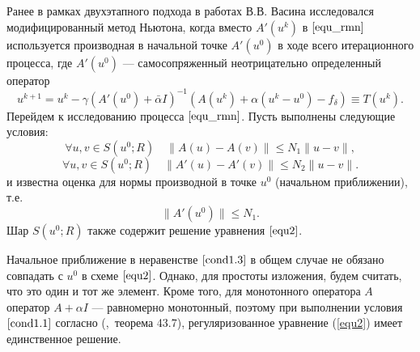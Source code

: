Ранее в рамках двухэтапного подхода в работах В.В. Васина \cite{VasAkiMin2013, Vasin2014} исследовался модифицированный метод Ньютона, когда вместо $A'(u^k)$ в $\eqref{equ_rmn}$ используется производная в начальной точке $A'(u^0)$ в ходе всего итерационного процесса, где $A'(u^0)$ --- самосопряженный неотрицательно определенный оператор  
$$
u^{k+1}=u^k-\gamma(A'(u^0)+\bar\alpha I)^{-1}(A(u^k)+\alpha(u^k-u^0)-f_\delta)\equiv{T(u^k)}.
$$
Перейдем к исследованию процесса $\eqref{equ_rmn}$. Пусть выполнены следующие условия:
\begin{equation}\label{cond1.1}
\forall u, v \in S(u^0; R) \quad \|A(u)-A(v)\|\le N_1\|u-v\|,
\end{equation}
\begin{equation}\label{cond1.2}
\forall u, v \in S(u^0; R) \quad \|A'(u)-A'(v)\|\le N_2\|u-v\|.
\end{equation}
и известна оценка для нормы производной в точке $u^0$ (начальном приближении), т.е.
\begin{equation}\label{cond1.3}
\|A'(u^0)\|\le N_1.
\end{equation}
Шар $S(u^0; R)$ также содержит решение уравнения $\eqref{equ2}$. 
\begin{remark}
	Начальное приближение в неравенстве $\eqref{cond1.3}$ в общем случае не обязано совпадать с $u^0$ в схеме $\eqref{equ2}$. Однако, для простоты изложения, будем считать, что это один и тот же элемент. Кроме того, для монотонного оператора $A$ оператор $A+\alpha I$ --- равномерно монотонный, поэтому при выполнении условия $\ref{cond1.1}$ согласно (\cite{KufFuch1988},~теорема 43.7), регуляризованное уравнение (\ref{equ2}) имеет единственное решение.
\end{remark}

